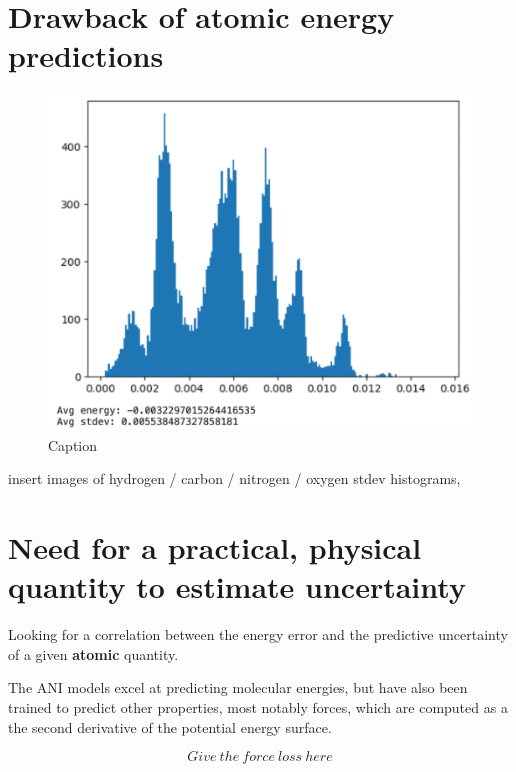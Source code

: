 \section{Drawback of atomic energy predictions}


\begin{figure}
    \centering
    \includegraphics[width=0.5\linewidth]{Images/useful figures/energies/2x_carbon_e_std.png}
    \caption{Caption}
    \label{fig:2x_c_ae_std}
\end{figure}

insert images of hydrogen / carbon / nitrogen / oxygen stdev histograms, 

\section{Need for a practical, physical quantity to estimate uncertainty}

Looking for a correlation between the energy error and the predictive uncertainty of a given \textbf{atomic} quantity.

The ANI models excel at predicting molecular energies, but have also been trained to predict other properties, most notably forces, which are computed as a the second derivative of the potential energy surface. 

\begin{equation}
    Give\ the\ force\ loss\ here
\end{equation}


